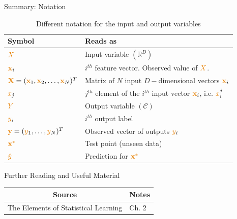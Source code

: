 \documentclass[aspectratio=169,10pt]{beamer}
\begin{document}
\begin{frame}{Summary: Notation}
	
	\begin{table}
		\begin{tabular}{|l | l | }
			\hline
			Symbol & Reads as \\
			\hline \hline
			$\bigX$ & Input variable $(\mathbb{R}^D)$ \\ 
			$\boldx_i$ & $i^{th}$ feature vector.  Observed value of $\bigX$.  \\
			$\mathbf{\bigx}=(\boldx_1,\boldx_2, \ldots, \boldx_N)^T$ & Matrix of $N$ input $D-$dimensional vectors $\boldx_i$\\
			$\smallx_{j}$ & $j^{th}$ element of the $i^{th}$ input vector $\boldx_i$, i.e. $\smallx_i^j$ \\ 
			$\bigy$ & Output variable  $(\mathcal{C})$\\ 
			$\smally_i$ & $i^{th}$ output label\\ 
			$\boldy=(\smally_1, \ldots, \smally_N)^T$ & Observed vector of outputs $\smally_i$\\
			$\unseenx$ & Test point (unseen data) \\
			$\predy$ & Prediction for $\unseenx$ \\
			\hline
		\end{tabular}
		\caption{Different notation for the input and output variables}
	\end{table}

\end{frame}

\begin{frame}{Further Reading and Useful Material}
	
	\begin{table}
		\begin{tabular}{|l | l | }
			\hline
			\multicolumn{1}{|c|}{\textbf{Source}} & \multicolumn{1}{c|}{\textbf{Notes}} \\
			\hline
			The Elements of Statistical Learning &	Ch. 2 \\
			\hline
		\end{tabular}
	\end{table}
	
	
\end{frame}
\end{document}
